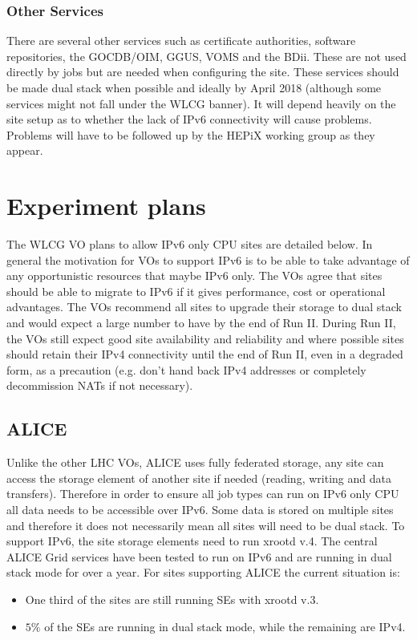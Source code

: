 \documentclass[11pt]{article}
\begin{document}
\subsubsection{Other Services}
There are several other services such as certificate authorities, software repositories, the GOCDB/OIM, GGUS, VOMS and the BDii.  These are not used directly by jobs but are needed when configuring the site.  These services should be made dual stack when possible and ideally by April 2018 (although some services might not fall under the WLCG banner).   It will depend heavily on the site setup as to whether the lack of IPv6 connectivity will cause problems.  Problems will have to be followed up by the HEPiX working group as they appear. 

\section{Experiment plans}
The WLCG VO plans to allow IPv6 only CPU sites are detailed below.  In general the motivation for VOs to support IPv6 is to be able to take advantage of any opportunistic resources that maybe IPv6 only.  The VOs agree that sites should be able to migrate to IPv6 if it gives performance, cost or operational advantages.  The VOs recommend all sites to upgrade their storage to dual stack and would expect a large number to have by the end of Run II.  During Run II, the VOs  still expect good site availability and reliability and where possible sites should retain their IPv4 connectivity until the end of Run II, even in a degraded form, as a precaution (e.g. don't hand back IPv4 addresses or completely decommission NATs if not necessary).

\subsection{ALICE}
Unlike the other LHC VOs, ALICE uses fully federated storage, any site can access the storage element of another site if needed (reading, writing and data transfers).  Therefore in order to ensure all job types can run on IPv6 only CPU all data needs to be accessible over IPv6.  Some data is stored on multiple sites and therefore it does not necessarily mean all sites will need to be dual stack.  To support IPv6, the site storage elements need to run xrootd v.4.  The central ALICE Grid services have been tested to run on IPv6 and are running in dual stack mode for over a year.  For sites supporting ALICE the current situation is:
\begin{itemize}
\item One third of the sites are still running SEs with xrootd v.3.
\item $5\%$ of the SEs are running in dual stack mode, while the remaining are IPv4.
\end{itemize}
\end{document}
